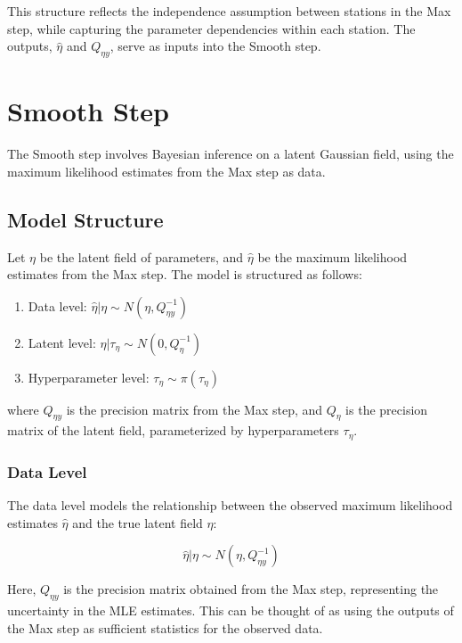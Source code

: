 \documentclass[
  letterpaper,
  DIV=11,
  numbers=noendperiod]{scrartcl}
\providecommand{\tightlist}{%
  \setlength{\itemsep}{0pt}\setlength{\parskip}{0pt}}\usepackage{longtable,booktabs,array}
\begin{document}
This structure reflects the independence assumption between stations in
the Max step, while capturing the parameter dependencies within each
station. The outputs, \(\hat \eta\) and \(Q_{\eta y}\), serve as inputs
into the Smooth step.

\section{Smooth Step}\label{smooth-step}

The Smooth step involves Bayesian inference on a latent Gaussian field,
using the maximum likelihood estimates from the Max step as data.

\subsection{Model Structure}\label{model-structure}

Let \(\eta\) be the latent field of parameters, and \(\hat{\eta}\) be
the maximum likelihood estimates from the Max step. The model is
structured as follows:

\begin{enumerate}
\def\labelenumi{\arabic{enumi}.}
\tightlist
\item
  Data level: \(\hat{\eta} | \eta \sim N(\eta, Q_{\eta y}^{-1})\)
\item
  Latent level: \(\eta | \tau_\eta \sim N(0, Q_\eta^{-1})\)
\item
  Hyperparameter level: \(\tau_\eta \sim \pi(\tau_\eta)\)
\end{enumerate}

where \(Q_{\eta y}\) is the precision matrix from the Max step, and
\(Q_\eta\) is the precision matrix of the latent field, parameterized by
hyperparameters \(\tau_\eta\).

\subsubsection{Data Level}\label{data-level}

The data level models the relationship between the observed maximum
likelihood estimates \(\hat{\eta}\) and the true latent field \(\eta\):

\[\hat{\eta} | \eta \sim N(\eta, Q_{\eta y}^{-1})\]

Here, \(Q_{\eta y}\) is the precision matrix obtained from the Max step,
representing the uncertainty in the MLE estimates. This can be thought
of as using the outputs of the Max step as sufficient statistics for the
observed data.
\end{document}
